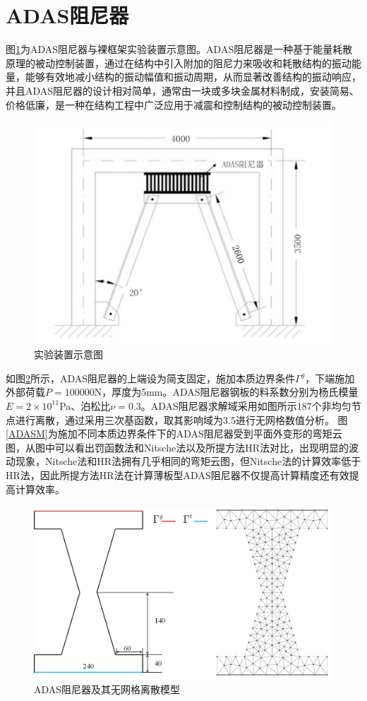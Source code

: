 \section{ADAS阻尼器}
图\ref{ADAS1}为ADAS阻尼器与裸框架实验装置示意图。ADAS阻尼器是一种基于能量耗散原理的被动控制装置，通过在结构中引入附加的阻尼力来吸收和耗散结构的振动能量，能够有效地减小结构的振动幅值和振动周期，从而显著改善结构的振动响应，
并且ADAS阻尼器的设计相对简单，通常由一块或多块金属材料制成，安装简易、价格低廉，是一种在结构工程中广泛应用于减震和控制结构的被动控制装置。
\begin{figure}[H]
    \centering
    \includegraphics[scale=0.6]{figure/DAMPER/ADAS/1.png}
    \caption{实验装置示意图\cite{basu2016}}\label{ADAS1}
\end{figure}
如图\ref{ADASmsh}所示，ADAS阻尼器的上端设为简支固定，施加本质边界条件$\Gamma^g$，下端施加外部荷载$P=100000$N，厚度为5mm。ADAS阻尼器钢板的料系数分别为杨氏模量$E=2\times 10^{11}$Pa、泊松比$\nu=0.3$。ADAS阻尼器求解域采用如图所示187个非均匀节点进行离散，通过采用三次基函数，取其影响域为3.5进行无网格数值分析。
图\ref{ADASM}为施加不同本质边界条件下的ADAS阻尼器受到平面外变形的弯矩云图，从图中可以看出罚函数法和Nitsche法以及所提方法HR法对比，出现明显的波动现象，Nitsche法和HR法拥有几乎相同的弯矩云图，但Nitsche法的计算效率低于HR法，因此所提方法HR法在计算薄板型ADAS阻尼器不仅提高计算精度还有效提高计算效率。
\newpage
\begin{figure}[H]
    \centering
    \includegraphics[scale=0.45]{figure/DAMPER/ADAS/ADAS damper_msh.png}
    \caption{ADAS阻尼器及其无网格离散模型}\label{ADASmsh}
\end{figure}
